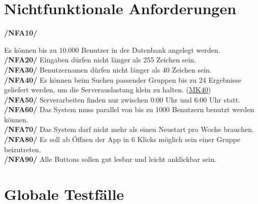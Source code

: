 \documentclass[a4paper]{scrreprt}
\begin{document}
\chapter{Nichtfunktionale Anforderungen}

\begin{addmargin}[25pt]{0pt}

\hypertarget{nfa10}{\textbf{/NFA10/}} Es können bis zu 10.000 Benutzer in der Datenbank angelegt werden.\\
\hypertarget{nfa20}{\textbf{/NFA20/}} Eingaben dürfen nicht länger als 255 Zeichen sein.\\
\hypertarget{nfa30}{\textbf{/NFA30/}} Benutzernamen dürfen nicht länger als 40 Zeichen sein.\\
\hypertarget{nfa40}{\textbf{/NFA40/}} Es können beim Suchen passender Gruppen bis zu 24 Ergebnisse geliefert werden, um die Serverauslastung klein zu halten. (\hyperlink{m40}{MK40})\\
\hypertarget{nfa50}{\textbf{/NFA50/}} Serverarbeiten finden nur zwischen 0:00 Uhr und 6:00 Uhr statt.\\
\hypertarget{nfa60}{\textbf{/NFA60/}} Das System muss parallel von bis zu 1000 Benutzern benutzt werden können.\\
\hypertarget{nfa70}{\textbf{/NFA70/}} Das System darf nicht mehr als einen Neustart pro Woche brauchen.\\
\hypertarget{nfa80}{\textbf{/NFA80/}} Es soll ab Öffnen der App in 6 Klicks möglich sein einer Gruppe beizutreten.\\
\hypertarget{nfa90}{\textbf{/NFA90/}} Alle Buttons sollen gut lesbar und leicht anklickbar sein.\\

\end{addmargin}


\chapter{Globale Testfälle}
\end{document}
